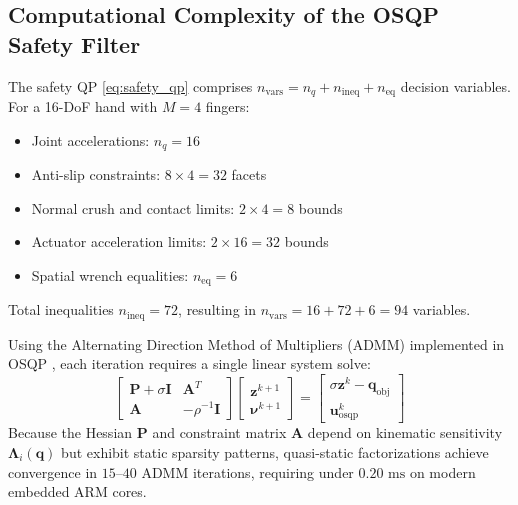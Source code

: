 \subsection{Computational Complexity of the OSQP Safety Filter}
The safety QP \eqref{eq:safety_qp} comprises $n_{\text{vars}} = n_q + n_{\text{ineq}} + n_{\text{eq}}$ decision variables. For a 16-DoF hand with $M = 4$ fingers:
\begin{itemize}
    \item Joint accelerations: $n_q = 16$
    \item Anti-slip constraints: $8 \times 4 = 32$ facets
    \item Normal crush and contact limits: $2 \times 4 = 8$ bounds
    \item Actuator acceleration limits: $2 \times 16 = 32$ bounds
    \item Spatial wrench equalities: $n_{\text{eq}} = 6$
\end{itemize}
Total inequalities $n_{\text{ineq}} = 72$, resulting in $n_{\text{vars}} = 16 + 72 + 6 = 94$ variables.

Using the Alternating Direction Method of Multipliers (ADMM) implemented in OSQP \cite{stellato2020osqp}, each iteration requires a single linear system solve:
\begin{equation}
    \begin{bmatrix} \mathbf{P} + \sigma \mathbf{I} & \mathbf{A}^T \\ \mathbf{A} & -\rho^{-1} \mathbf{I} \end{bmatrix} \begin{bmatrix} \mathbf{z}^{k+1} \\ \boldsymbol{\nu}^{k+1} \end{bmatrix} = \begin{bmatrix} \sigma \mathbf{z}^k - \mathbf{q}_{\text{obj}} \\ \mathbf{u}_{\text{osqp}}^k \end{bmatrix}
\end{equation}
Because the Hessian $\mathbf{P}$ and constraint matrix $\mathbf{A}$ depend on kinematic sensitivity $\mathbf{\Lambda}_i(\mathbf{q})$ but exhibit static sparsity patterns, quasi-static factorizations achieve convergence in $15\text{--}40$ ADMM iterations, requiring under $0.20\text{ ms}$ on modern embedded ARM cores.
